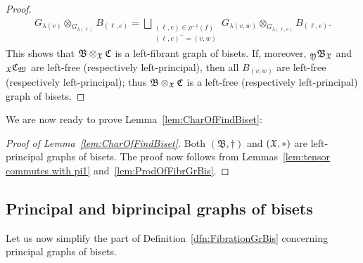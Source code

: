 \documentclass{amsart}
\begin{document}
\begin{proof}
\begin{align*}
    G_{\lambda(v)}\otimes_{G_{\lambda(\ell)}} B_{(\ell, e)} = \bigsqcup_{\substack{(\ell,e)\in \rho^{-1}(f)\\ (\ell,e)^-=(v,w)}}
    G_{\lambda(v,w)}\otimes_{G_{\lambda(\ell,e)}} B_{(\ell, e)}.
  \end{align*} 
  This shows that $\mathfrak B\otimes_{\mathfrak X}\mathfrak C$ is a
  left-fibrant graph of bisets. If, moreover,
  ${}_{\mathfrak Y}\mathfrak B_{\mathfrak X}$ and
  ${}_{\mathfrak X}\mathfrak C_{\mathfrak W}$ are left-free (respectively
  left-principal), then all $B_{(v,w)}$ are left-free (respectively
  left-principal); thus $\mathfrak B\otimes_{\mathfrak X}\mathfrak C$ is a
  left-free (respectively left-principal) graph of bisets.
\end{proof}

\noindent We are now ready to prove Lemma~\ref{lem:CharOfFindBiset}:
\begin{proof}[Proof of Lemma~\ref{lem:CharOfFindBiset}]
  Both $(\mathfrak B, \dagger)$ and $({\mathfrak X},*)$ are left-principal graphs of
  bisets. The proof now follows from Lemmas~\ref{lem:tensor commutes with
    pi1} and~\ref{lem:ProdOfFibrGrBis}.
\end{proof}

\subsection{Principal and biprincipal graphs of bisets}\label{ss:BiprGrBis}
Let us now simplify the part of Definition~\ref{dfn:FibrationGrBis}
concerning principal graphs of bisets.
\end{document}
